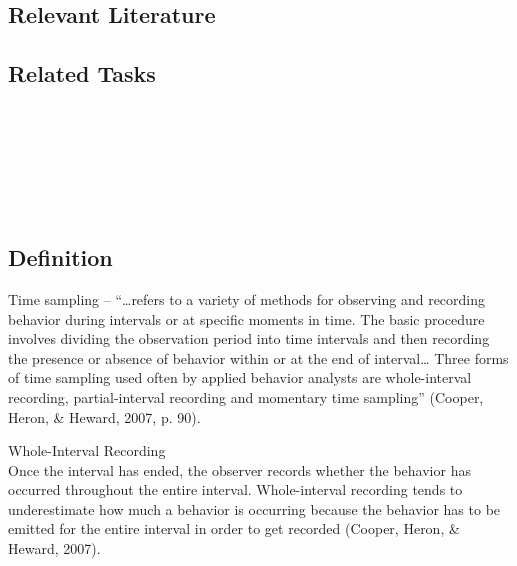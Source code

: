 \subsection{Relevant Literature}
\begin{refsection}
\nocite{test,alang2017police,clayton2018black}
\printbibliography[heading=none]
\end{refsection}
%
\subsection{Related Tasks} 
\fouraNine{}\\ 
\fourhOne{}\\
\fouriOne{}\\
\fourFKFourtySeven{}\\
\fourFKFourtyEight{}\\
%
%
%
%
\section[\fouraThirteen{}]{\fouraThirteen{}%
              }
\subsection{Definition}
Time sampling – ``…refers to a variety of methods for observing and recording behavior during intervals or at specific moments in time. The basic procedure involves dividing the observation period into time intervals and then recording the presence or absence of behavior within or at the end of interval… Three forms of time sampling used often by applied behavior analysts are whole-interval recording, partial-interval recording and momentary time sampling'' (Cooper, Heron, \& Heward, 2007, p. 90). 

Whole-Interval Recording\\
Once the interval has ended, the observer records whether the behavior has occurred throughout the entire interval. Whole-interval recording tends to underestimate how much a behavior is occurring because the behavior has to be emitted for the entire interval in order to get recorded (Cooper, Heron, \& Heward, 2007).

